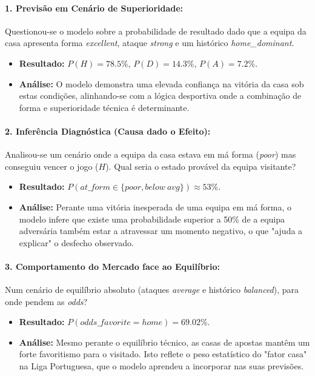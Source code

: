 \documentclass[10pt]{article}
\begin{document}
\paragraph{1. Previsão em Cenário de Superioridade:}
Questionou-se o modelo sobre a probabilidade de resultado dado que a equipa da casa apresenta forma \textit{excellent}, ataque \textit{strong} e um histórico \textit{home\_dominant}.
\begin{itemize}
    \item \textbf{Resultado:} $P(H) = 78.5\%$, $P(D) = 14.3\%$, $P(A) = 7.2\%$.
    \item \textbf{Análise:} O modelo demonstra uma elevada confiança na vitória da casa sob estas condições, alinhando-se com a lógica desportiva onde a combinação de forma e superioridade técnica é determinante.
\end{itemize}

\paragraph{2. Inferência Diagnóstica (Causa dado o Efeito):}
Analisou-se um cenário onde a equipa da casa estava em má forma (\textit{poor}) mas conseguiu vencer o jogo ($H$). Qual seria o estado provável da equipa visitante?
\begin{itemize}
    \item \textbf{Resultado:} $P(at\_form \in \{poor, below\ avg\}) \approx 53\%$.
    \item \textbf{Análise:} Perante uma vitória inesperada de uma equipa em má forma, o modelo infere que existe uma probabilidade superior a 50\% de a equipa adversária também estar a atravessar um momento negativo, o que "ajuda a explicar" o desfecho observado.
\end{itemize}

\paragraph{3. Comportamento do Mercado face ao Equilíbrio:}
Num cenário de equilíbrio absoluto (ataques \textit{average} e histórico \textit{balanced}), para onde pendem as \textit{odds}?
\begin{itemize}
    \item \textbf{Resultado:} $P(odds\_favorite = home) = 69.02\%$.
    \item \textbf{Análise:} Mesmo perante o equilíbrio técnico, as casas de apostas mantêm um forte favoritismo para o visitado. Isto reflete o peso estatístico do "fator casa" na Liga Portuguesa, que o modelo aprendeu a incorporar nas suas previsões.
\end{itemize}
\end{document}
